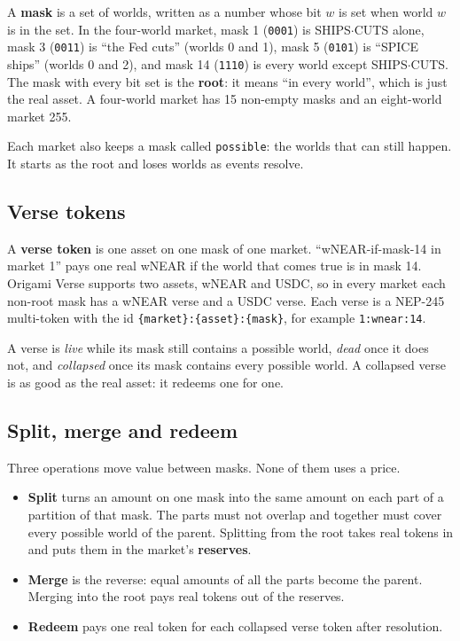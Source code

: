 \documentclass[11pt,a4paper]{article}
\newcommand{\wSC}{\textsf{SHIPS$\cdot$CUTS}}
\newcommand{\code}[1]{\texttt{\small #1}}
\begin{document}
A \textbf{mask} is a set of worlds, written as a number whose bit $w$ is set when world $w$ is in the set. In the
four-world market, mask 1 (\code{0001}) is \wSC{} alone, mask 3 (\code{0011}) is ``the Fed cuts'' (worlds 0 and 1),
mask 5 (\code{0101}) is ``SPICE ships'' (worlds 0 and 2), and mask 14 (\code{1110}) is every world except \wSC.
The mask with every bit set is the \textbf{root}: it means ``in every world'', which is just the real asset.
A four-world market has 15 non-empty masks and an eight-world market 255.

Each market also keeps a mask called \code{possible}: the worlds that can still happen. It starts as the root and
loses worlds as events resolve.

\subsection{Verse tokens}

A \textbf{verse token} is one asset on one mask of one market. ``wNEAR-if-mask-14 in market 1'' pays one real wNEAR
if the world that comes true is in mask 14. Origami Verse supports two assets, wNEAR and USDC, so in every market each
non-root mask has a wNEAR verse and a USDC verse. Each verse is a NEP-245 multi-token \cite{nep245} with the id
\code{\{market\}:\{asset\}:\{mask\}}, for example \code{1:wnear:14}.

A verse is \emph{live} while its mask still contains a possible world, \emph{dead} once it does not, and
\emph{collapsed} once its mask contains every possible world. A collapsed verse is as good as the real asset: it
redeems one for one.

\subsection{Split, merge and redeem}

Three operations move value between masks. None of them uses a price.

\begin{itemize}
\item \textbf{Split} turns an amount on one mask into the same amount on each part of a partition of that mask. The
parts must not overlap and together must cover every possible world of the parent. Splitting from the root takes
real tokens in and puts them in the market's \textbf{reserves}.
\item \textbf{Merge} is the reverse: equal amounts of all the parts become the parent. Merging into the root pays
real tokens out of the reserves.
\item \textbf{Redeem} pays one real token for each collapsed verse token after resolution.
\end{itemize}
\end{document}
